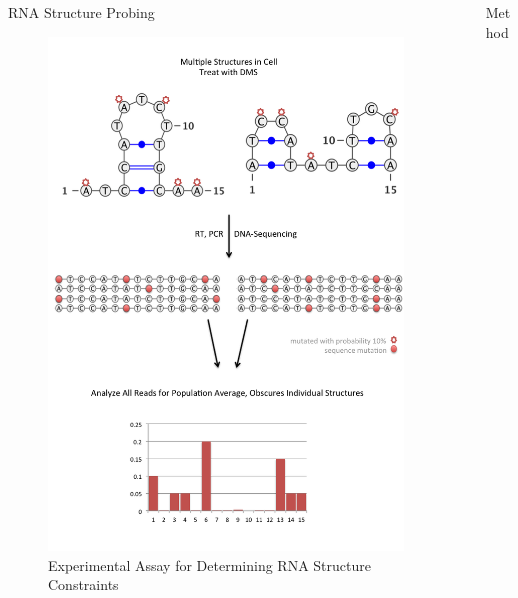 \documentclass[final]{beamer}
\newlength{\sepwid}
\newlength{\onecolwid}
\begin{document}
\begin{frame}[t]
\begin{columns}[t]
\begin{column}{\onecolwid}
\begin{block}{RNA Structure Probing}
\begin{figure}[!ht]
\includegraphics[width=0.9\linewidth]{images/dms_process.png}
\caption{Experimental Assay for Determining RNA Structure Constraints}
\end{figure}

\end{block}




\end{column} %

\begin{column}{\sepwid}\end{column} %

\begin{column}{\onecolwid} %

\begin{block}{Method}


\end{block}
\end{column}
\end{columns}
\end{frame}
\end{document}

